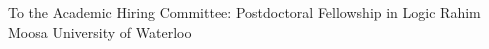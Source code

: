 \documentclass[11pt]{letter}
\begin{document}





\coverletter
  {}
  {To the Academic Hiring Committee:}
  {Postdoctoral Fellowship in Logic}
  {\mathjobs}
  {Rahim Moosa}
  {University of Waterloo}
  {\generic}
\end{document}
